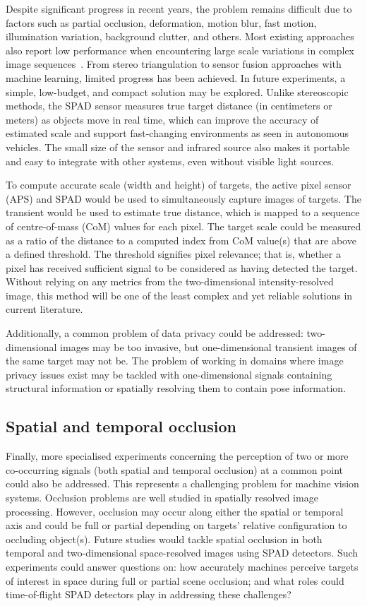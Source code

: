 \documentclass[12pt,a4paper,oneside]{report}
\begin{document}
Despite significant progress in recent years, the problem remains difficult due to factors such as partial occlusion, deformation, motion blur, fast motion, illumination variation, background clutter, and others. Most existing approaches also report low performance when encountering large scale variations in complex image sequences~\cite{depthpro2024}. From stereo triangulation to sensor fusion approaches with machine learning, limited progress has been achieved. In future experiments, a simple, low-budget, and compact solution may be explored. Unlike stereoscopic methods, the SPAD sensor measures true target distance (in centimeters or meters) as objects move in real time, which can improve the accuracy of estimated scale and support fast-changing environments as seen in autonomous vehicles. The small size of the sensor and infrared source also makes it portable and easy to integrate with other systems, even without visible light sources.

To compute accurate scale (width and height) of targets, the active pixel sensor (APS) and SPAD would be used to simultaneously capture images of targets. The transient would be used to estimate true distance, which is mapped to a sequence of centre-of-mass (CoM) values for each pixel. The target scale could be measured as a ratio of the distance to a computed index from CoM value(s) that are above a defined threshold. The threshold signifies pixel relevance; that is, whether a pixel has received sufficient signal to be considered as having detected the target. Without relying on any metrics from the two-dimensional intensity-resolved image, this method will be one of the least complex and yet reliable solutions in current literature.

Additionally, a common problem of data privacy could be addressed: two-dimensional images may be too invasive, but one-dimensional transient images of the same target may not be. The problem of working in domains where image privacy issues exist may be tackled with one-dimensional signals containing structural information or spatially resolving them to contain pose information.

\subsection{Spatial and temporal occlusion}
\label{subsec:spatial_and_temporal_occlusion}

Finally, more specialised experiments concerning the perception of two or more co-occurring signals (both spatial and temporal occlusion) at a common point could also be addressed. This represents a challenging problem for machine vision systems. Occlusion problems are well studied in spatially resolved image processing. However, occlusion may occur along either the spatial or temporal axis and could be full or partial depending on targets' relative configuration to occluding object(s). Future studies would tackle spatial occlusion in both temporal and two-dimensional space-resolved images using SPAD detectors. Such experiments could answer questions on: how accurately machines perceive targets of interest in space during full or partial scene occlusion; and what roles could time-of-flight SPAD detectors play in addressing these challenges?
\end{document}
